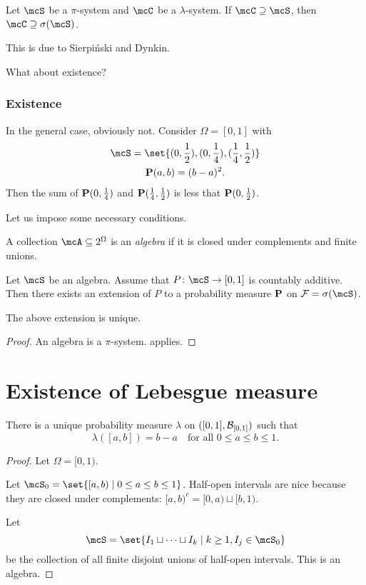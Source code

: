 \begin{theorem*}
\label{thm:pi-lambda}
    Let $\mcS$ be a $\pi$-system and $\mcC$ be a $\lambda$-system.
    If $\mcC \supseteq \mcS$, then $\mcC \supseteq \sigma(\mcS)$.
\end{theorem*}
This is due to Sierpiński and Dynkin.

What about existence?
\subsubsection{Existence}
In the general case, obviously not.
Consider $\Omega = [0, 1]$ with
\begin{gather*}
    \mcS = \set{(0, \frac12), (0, \frac14), (\frac14, \frac12)} \\
    \P(a, b) = (b - a)^2.
\end{gather*} Then the sum of $\P(0, \frac14)$ and $\P(\frac14, \frac12)$ is
less that $\P(0, \frac12)$.

Let us impose some necessary conditions.
\begin{definition*}[Algebra] \label{def:algebra}
    A collection $\mcA \subseteq 2^\Omega$ is an \emph{algebra}
    if it is closed under complements and finite unions.
\end{definition*}

\begin{theorem*} \label{thm:caratheodory}
    Let $\mcS$ be an algebra.
    Assume that $P\colon \mcS \to [0, 1]$ is countably additive.
    Then there exists an extension of $P$ to a probability measure
    $\P$ on $\F = \sigma(\mcS)$.
\end{theorem*}

\begin{corollary}
    The above extension is unique.
\end{corollary}
\begin{proof}
    An algebra is a $\pi$-system.
     applies.
\end{proof}

\section{Existence of Lebesgue measure} \label{sec:lebesgue}
\begin{theorem*} \label{thm:lebesgue}
    There is a unique probability measure $\lambda$ on
    $([0, 1], \B_{[0, 1]})$ such that \[
        \lambda([a, b]) = b - a \quad \text{for all } 0 \le a \le b \le 1.
    \]
\end{theorem*}
\begin{proof}
    Let $\Omega = [0, 1)$.

    Let $\mcS_0 = \set{[a, b) \mid 0 \le a \le b \le 1}$.
    Half-open intervals are nice because they are closed under complements:
    $[a, b)^c = [0, a) \sqcup [b, 1)$.

    Let \[
        \mcS = \set{I_1 \sqcup \cdots \sqcup I_k
                \mid k \ge 1, I_j \in \mcS_0}
    \] be the collection of all finite disjoint unions of
    half-open intervals.
    This is an algebra.
\end{proof}

